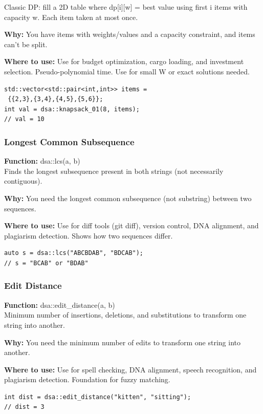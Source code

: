 \documentclass[11pt]{article}
\begin{document}
Classic DP: fill a 2D table where dp[i][w] = best value using first i items with capacity w. Each item taken at most once.

\textbf{Why:} You have items with weights/values and a capacity constraint, and items can't be split. \par \textbf{Where to use:} Use for budget optimization, cargo loading, and investment selection. Pseudo-polynomial time. Use for small W or exact solutions needed.

\begin{lstlisting}
std::vector<std::pair<int,int>> items =
 {{2,3},{3,4},{4,5},{5,6}};
int val = dsa::knapsack_01(8, items);
// val = 10
\end{lstlisting}

\subsubsection{Longest Common Subsequence}
\textbf{Function:} dsa::lcs(a, b)\\

Finds the longest subsequence present in both strings (not necessarily contiguous).

\textbf{Why:} You need the longest common subsequence (not substring) between two sequences. \par \textbf{Where to use:} Use for diff tools (git diff), version control, DNA alignment, and plagiarism detection. Shows how two sequences differ.

\begin{lstlisting}
auto s = dsa::lcs("ABCBDAB", "BDCAB");
// s = "BCAB" or "BDAB"
\end{lstlisting}

\subsubsection{Edit Distance}
\textbf{Function:} dsa::edit\_distance(a, b)\\

Minimum number of insertions, deletions, and substitutions to transform one string into another.

\textbf{Why:} You need the minimum number of edits to transform one string into another. \par \textbf{Where to use:} Use for spell checking, DNA alignment, speech recognition, and plagiarism detection. Foundation for fuzzy matching.

\begin{lstlisting}
int dist = dsa::edit_distance("kitten", "sitting");
// dist = 3
\end{lstlisting}
\end{document}
